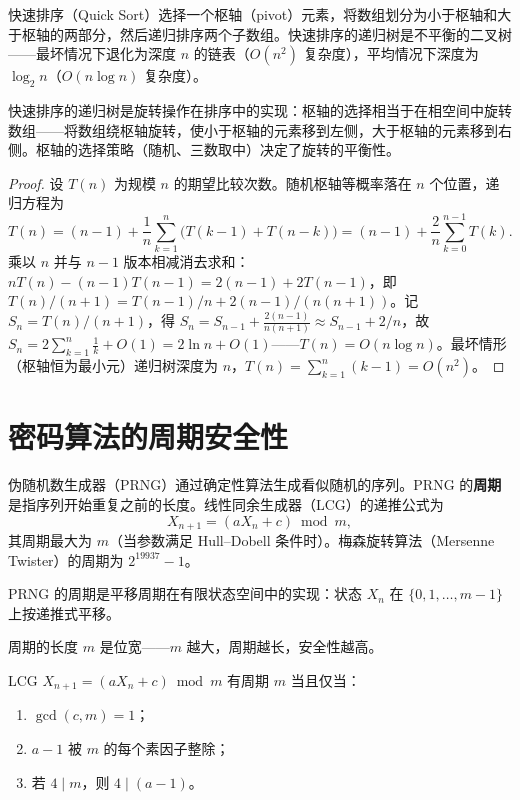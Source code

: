 \begin{proposition}[快速排序的递归周期]\label{prop:quicksort_cycle}
快速排序（Quick Sort）选择一个枢轴（pivot）元素，将数组划分为小于枢轴和大于枢轴的两部分，然后递归排序两个子数组。快速排序的递归树是不平衡的二叉树——最坏情况下退化为深度 $n$ 的链表（$O(n^2)$ 复杂度），平均情况下深度为 $\log_2 n$（$O(n \log n)$ 复杂度）。

快速排序的递归树是旋转操作在排序中的实现：枢轴的选择相当于在相空间中旋转数组——将数组绕枢轴旋转，使小于枢轴的元素移到左侧，大于枢轴的元素移到右侧。枢轴的选择策略（随机、三数取中）决定了旋转的平衡性。
\end{proposition}

\begin{proof}
设 $T(n)$ 为规模 $n$ 的期望比较次数。随机枢轴等概率落在 $n$ 个位置，递归方程为
\[
T(n) = (n-1) + \frac{1}{n}\sum_{k=1}^{n}\big( T(k-1) + T(n-k) \big)
= (n-1) + \frac{2}{n}\sum_{k=0}^{n-1} T(k).
\]
乘以 $n$ 并与 $n-1$ 版本相减消去求和：$nT(n) - (n-1)T(n-1) = 2(n-1) + 2T(n-1)$，即 $T(n)/(n+1) = T(n-1)/n + 2(n-1)/(n(n+1))$。记 $S_n = T(n)/(n+1)$，得 $S_n = S_{n-1} + \frac{2(n-1)}{n(n+1)} \approx S_{n-1} + 2/n$，故 $S_n = 2\sum_{k=1}^{n} \frac{1}{k} + O(1) = 2\ln n + O(1)$——$T(n) = O(n\log n)$。最坏情形（枢轴恒为最小元）递归树深度为 $n$，$T(n) = \sum_{k=1}^{n}(k-1) = O(n^2)$。
\end{proof}

\section{密码算法的周期安全性}

\begin{definition}[伪随机数生成器的周期]\label{def:prng_period}
伪随机数生成器（PRNG）通过确定性算法生成看似随机的序列。PRNG 的\textbf{周期}是指序列开始重复之前的长度。线性同余生成器（LCG）的递推公式为
\[
X_{n+1} = (a X_n + c) \bmod m,
\]
其周期最大为 $m$（当参数满足 Hull–Dobell 条件时）。梅森旋转算法（Mersenne Twister）的周期为 $2^{19937}-1$。

PRNG 的周期是平移周期在有限状态空间中的实现：状态 $X_n$ 在 $\{0,1,\dots,m-1\}$ 上按递推式平移。

周期的长度 $m$ 是位宽——$m$ 越大，周期越长，安全性越高。
\end{definition}

\begin{lemma}\label{lem:hull_dobell}
LCG $X_{n+1} = (a X_n + c) \bmod m$ 有周期 $m$ 当且仅当：
\begin{enumerate}[label=(\roman*)]
    \item $\gcd(c, m) = 1$；
    \item $a - 1$ 被 $m$ 的每个素因子整除；
    \item 若 $4 \mid m$，则 $4 \mid (a - 1)$。
\end{enumerate}
\end{lemma}

